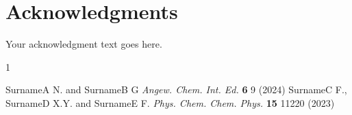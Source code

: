\documentclass[11pt]{article}
\begin{document}
\section*{\fontsize{11}{14}\selectfont Acknowledgments}
\vspace{-0.25cm}
\begin{flushleft}
\fontsize{11}{14}\selectfont %
Your acknowledgment text goes here.
\end{flushleft}


\begin{thebibliography}{1}
\small
\vspace{-0.25cm}

 SurnameA  N. and SurnameB G {\em Angew. Chem. Int. Ed.} {{\bf 6} 9 (2024)} 
\vspace{-0.25cm} %
 SurnameC  F., SurnameD X.Y. and SurnameE  F. {\em Phys. Chem. Chem. Phys.} {{\bf 15} 11220 (2023)}

\end{thebibliography}
\end{document}
